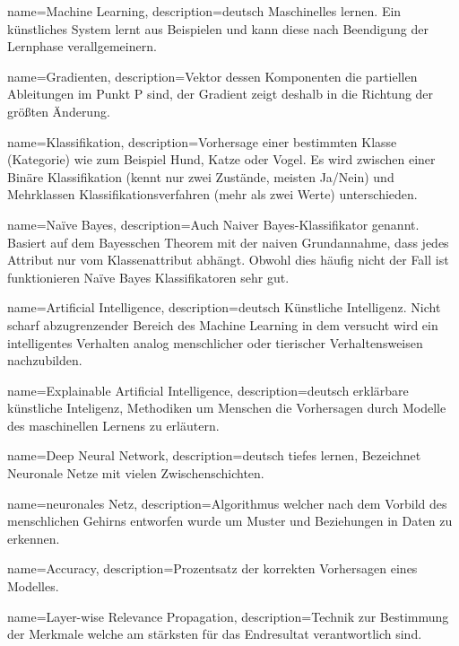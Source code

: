 
{
	name=Machine Learning,
	description={deutsch Maschinelles lernen. Ein künstliches System lernt aus Beispielen und kann diese nach Beendigung der Lernphase verallgemeinern. }
}

{
	name=Gradienten,
	description={Vektor dessen Komponenten die partiellen Ableitungen im Punkt P sind, der Gradient zeigt deshalb in die Richtung der größten Änderung. }
}

{
	name=Klassifikation,
	description={Vorhersage einer bestimmten Klasse (Kategorie) wie zum Beispiel Hund, Katze oder Vogel. Es wird zwischen einer Binäre Klassifikation (kennt nur zwei Zustände, meisten Ja/Nein) und Mehrklassen Klassifikationsverfahren (mehr als zwei Werte) unterschieden.  }
}

{
	name=Naïve Bayes,
	description={Auch Naiver Bayes-Klassifikator genannt. Basiert auf dem Bayesschen Theorem mit der naiven Grundannahme, dass jedes Attribut nur vom Klassenattribut abhängt. Obwohl dies häufig nicht der Fall ist funktionieren Naïve Bayes Klassifikatoren sehr gut. }
}

{
	name=Artificial Intelligence,
	description={deutsch Künstliche Intelligenz. Nicht scharf abzugrenzender Bereich des Machine Learning in dem versucht wird ein intelligentes Verhalten
	 analog menschlicher oder tierischer Verhaltensweisen nachzubilden. }
}

{
	name=Explainable Artificial Intelligence,
	description={deutsch erklärbare künstliche Inteligenz, Methodiken um Menschen die Vorhersagen durch Modelle des maschinellen Lernens zu erläutern. }
}

{
    name=Deep Neural Network,
    description={deutsch tiefes lernen, Bezeichnet Neuronale Netze mit vielen Zwischenschichten.}
}

{
	name=neuronales Netz,
	description={Algorithmus welcher nach dem Vorbild des menschlichen Gehirns entworfen wurde um Muster und Beziehungen in Daten zu erkennen.}   
}   

{
	name=Accuracy,
	description={Prozentsatz der korrekten Vorhersagen eines Modelles.}   
}   

{
	name=Layer-wise Relevance Propagation,
	description={Technik zur Bestimmung der Merkmale welche am stärksten für das Endresultat verantwortlich sind.}                                   
}                          


